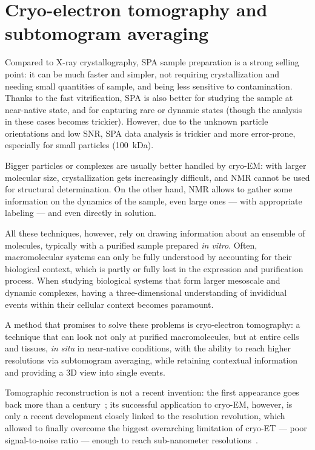 \chapter[Cryo-ET and STA]{Cryo-electron tomography and subtomogram averaging}\label{et}

Compared to X-ray crystallography, SPA sample preparation is a strong selling point: it can be much faster and simpler, not requiring crystallization and needing small quantities of sample, and being less sensitive to contamination.
Thanks to the fast vitrification, SPA is also better for studying the sample at near-native state, and for capturing rare or dynamic states (though the analysis in these cases becomes trickier).
However, due to the unknown particle orientations and low SNR, SPA data analysis is trickier and more error-prone, especially for small particles (\lesssim\qty{100}{\kilo\dalton}).

Bigger particles or complexes are usually better handled by cryo-EM: with larger molecular size, crystallization gets increasingly difficult, and NMR cannot be used for structural determination.
On the other hand, NMR allows to gather some information on the dynamics of the sample, even large ones --- with appropriate labeling --- and even directly in solution.

All these techniques, however, rely on drawing information about an ensemble of molecules, typically with a purified sample prepared \textit{in vitro}.
Often, macromolecular systems can only be fully understood by accounting for their biological context, which is partly or fully lost in the expression and purification process.
When studying biological systems that form larger mesoscale and dynamic complexes, having a three-dimensional understanding of invididual events within their cellular context becomes paramount.

A method that promises to solve these problems is cryo-electron tomography: a technique that can look not only at purified macromolecules, but at entire cells and tissues, \textit{in situ} in near-native conditions, with the ability to reach higher resolutions via subtomogram averaging, while retaining contextual information and providing a 3D view into single events.

Tomographic reconstruction is not a recent invention: the first appearance goes back more than a century~\cite{jDeterminationFunctionsTheir1917}; its successful application to cryo-EM, however, is only a recent development closely linked to the resolution revolution, which allowed to finally overcome the biggest overarching limitation of cryo-ET --- poor signal-to-noise ratio --- enough to reach sub-nanometer resolutions~\cite{lucicCryoelectronTomographyChallenge2013,turkPromiseChallengesCryoelectron2020}.


